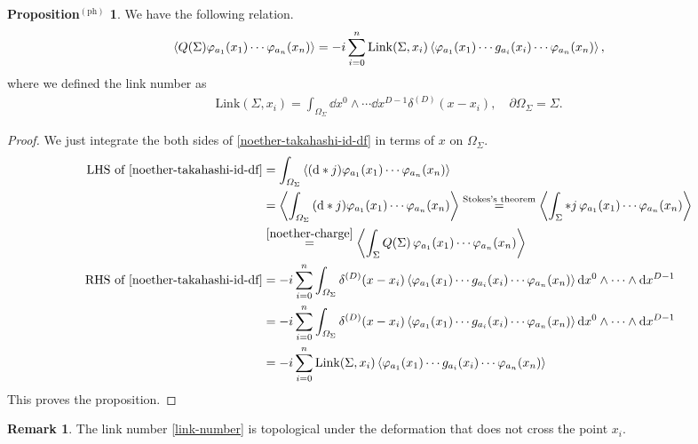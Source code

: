 \documentclass{article}
\theoremstyle{definition}
\newtheorem{propositionph}{Proposition$^\mathrm{(ph)}$}[section]
\newtheorem{remark}{Remark}[section]
\numberwithin{equation}{section}
\newcommand{\link}{\mathrm{Link}}
\begin{document}
\begin{propositionph}
  We have the following relation.
  \begin{align}
    \ev{Q(\Sigma)\varphi_{a_1}(x_1) \cdots \varphi_{a_n}(x_n)}
    = -i \sum_{i = 0}^{n}  \link(\Sigma, x_i)\ev{\varphi_{a_1}(x_1) \cdots g_{a_i}(x_i) \cdots \varphi_{a_n}(x_n)}, \label{noether-charge-cf}
  \end{align}
  where we defined the link number as
  \begin{align}
    \link(\Sigma, x_i) = \int_{\varOmega_{\Sigma}} \dd x^0 \wedge \cdots \dd x^{D-1} \delta^{(D)} (x - x_i), \quad \partial\varOmega_{\Sigma} = \Sigma. \label{link-number}
  \end{align}
\end{propositionph}

\begin{proof}
  We just integrate the both sides of \eqref{noether-takahashi-id-df} in terms of $x$ on $\varOmega_\Sigma$.
  \begin{align}
    \text{LHS of } \eqref{noether-takahashi-id-df} &= \int_{\varOmega_\Sigma}\ev{(\dd * j) \varphi_{a_1}(x_1) \cdots \varphi_{a_n}(x_n)} \notag\\
                                                   &= \ev{\int_{\varOmega_\Sigma}\qty(\dd * j) \varphi_{a_1}(x_1) \cdots \varphi_{a_n}(x_n)}\overset{\text{Stokes's theorem}}{=}
                                                     \ev{\int_{\Sigma} * j \, \varphi_{a_1}(x_1) \cdots \varphi_{a_n}(x_n)} \notag\\
                                                   &\overset{\eqref{noether-charge}}{=} \ev{\int_{\Sigma} Q(\Sigma) \, \varphi_{a_1}(x_1) \cdots \varphi_{a_n}(x_n)} \\
    \text{RHS of } \eqref{noether-takahashi-id-df} &= -i \sum_{i = 0}^{n} \int_{\varOmega_\Sigma} \delta^{(D)}(x - x_i)
                                                     \ev{\varphi_{a_1}(x_1) \cdots g_{a_i}(x_i) \cdots \varphi_{a_n}(x_n)} \dd x^0 \wedge \cdots \wedge \dd x^{D-1} \notag \\
                                                   &= -i \sum_{i = 0}^{n} \int_{\varOmega_\Sigma} \delta^{(D)}(x - x_i)
                                                     \ev{\varphi_{a_1}(x_1) \cdots g_{a_i}(x_i) \cdots \varphi_{a_n}(x_n)} \dd x^0 \wedge \cdots \wedge \dd x^{D-1} \notag \\
                                                   &= -i \sum_{i=0}^{n} \link(\Sigma, x_i)\ev{\varphi_{a_1}(x_1) \cdots g_{a_i}(x_i) \cdots \varphi_{a_n}(x_n)}
  \end{align}
  This proves the proposition.
\end{proof}
\begin{remark}
  The link number \eqref{link-number} is topological under the deformation that does not cross the point $x_i$.
\end{remark}
\end{document}
